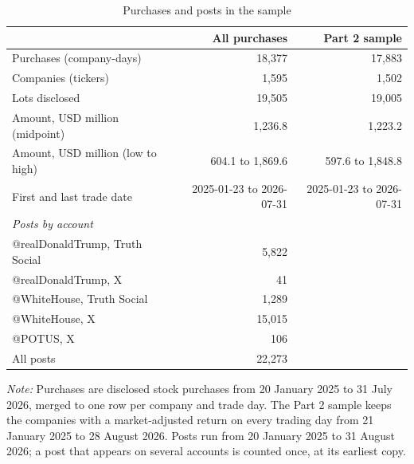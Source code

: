 \begin{table}[htbp]
\centering
\small
\setlength{\tabcolsep}{4pt}
\caption{Purchases and posts in the sample}
\label{tab:sample}
\begin{tabular}{lrr}
\toprule
 & All purchases & Part 2 sample \\
\midrule
Purchases (company-days) & 18,377 & 17,883 \\
Companies (tickers) & 1,595 & 1,502 \\
Lots disclosed & 19,505 & 19,005 \\
Amount, USD million (midpoint) & 1,236.8 & 1,223.2 \\
Amount, USD million (low to high) & 604.1 to 1,869.6 & 597.6 to 1,848.8 \\
First and last trade date & 2025-01-23 to 2026-07-31 & 2025-01-23 to 2026-07-31 \\
\midrule
\textit{Posts by account} &  &  \\
@realDonaldTrump, Truth Social & 5,822 &  \\
@realDonaldTrump, X & 41 &  \\
@WhiteHouse, Truth Social & 1,289 &  \\
@WhiteHouse, X & 15,015 &  \\
@POTUS, X & 106 &  \\
All posts & 22,273 &  \\
\bottomrule
\end{tabular}
\par\medskip
\begin{minipage}{\linewidth}\footnotesize\textit{Note:} Purchases are disclosed stock purchases from 20 January 2025 to 31 July 2026, merged to one row per company and trade day. The Part 2 sample keeps the companies with a market-adjusted return on every trading day from 21 January 2025 to 28 August 2026. Posts run from 20 January 2025 to 31 August 2026; a post that appears on several accounts is counted once, at its earliest copy.\end{minipage}
\end{table}
